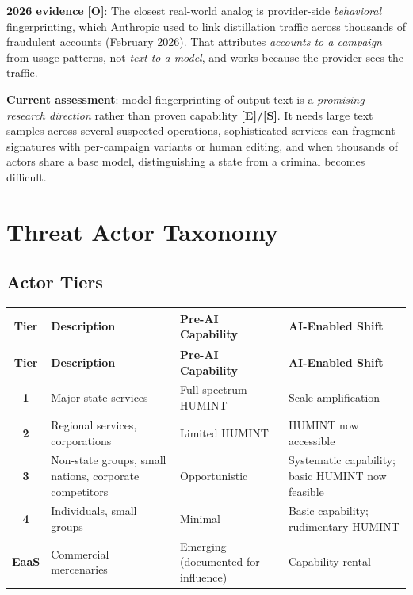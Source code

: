 \documentclass[11pt,letterpaper]{article}
\begin{document}
\textbf{2026 evidence} \textbf{[O]}: The closest real-world analog is provider-side \textit{behavioral} fingerprinting, which Anthropic used to link distillation traffic across thousands of fraudulent accounts (February 2026). That attributes \textit{accounts to a campaign} from usage patterns, not \textit{text to a model}, and works because the provider sees the traffic.

\begin{warnbox}[Limitations]
\textbf{Current assessment}: model fingerprinting of output text is a \textit{promising research direction} rather than proven capability \textbf{[E]/[S]}. It needs large text samples across several suspected operations, sophisticated services can fragment signatures with per-campaign variants or human editing, and when thousands of actors share a base model, distinguishing a state from a criminal becomes difficult.
\end{warnbox}

\section{Threat Actor Taxonomy}\label{sec:actors}

\subsection{Actor Tiers}

{\small
\begin{longtable}{cL{3.5cm}L{3cm}L{4cm}}
\toprule
\textbf{Tier} & \textbf{Description} & \textbf{Pre-AI Capability} & \textbf{AI-Enabled Shift} \\
\midrule
\endfirsthead
\toprule
\textbf{Tier} & \textbf{Description} & \textbf{Pre-AI Capability} & \textbf{AI-Enabled Shift} \\
\midrule
\endhead
\textbf{1} & Major state services & Full-spectrum HUMINT & Scale amplification \\*
\textbf{2} & Regional services, corporations & Limited HUMINT & HUMINT now accessible \\
\textbf{3} & Non-state groups, small nations, corporate competitors & Opportunistic & Systematic capability; basic HUMINT now feasible \\
\textbf{4} & Individuals, small groups & Minimal & Basic capability; rudimentary HUMINT \\*
\textbf{EaaS} & Commercial mercenaries & Emerging (documented for influence) & Capability rental \\
\bottomrule
\end{longtable}}
\end{document}
